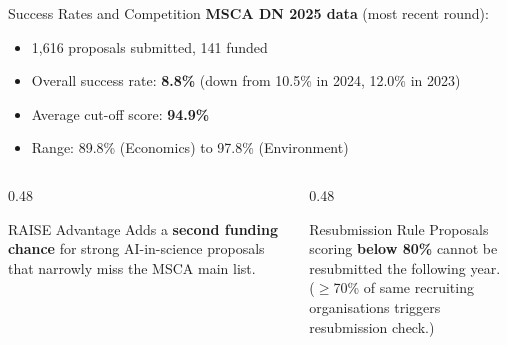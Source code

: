 \documentclass[aspectratio=169]{beamer}
\newcommand{\highlight}[1]{\textcolor{euBlue}{\textbf{#1}}}
\begin{document}
\begin{frame}{Success Rates and Competition}
\textbf{MSCA DN 2025 data} (most recent round):
\begin{itemize}
  \item 1,616 proposals submitted, 141 funded
  \item Overall success rate: \highlight{8.8\%} (down from 10.5\% in 2024, 12.0\% in 2023)
  \item Average cut-off score: \highlight{94.9\%}
  \item Range: 89.8\% (Economics) to 97.8\% (Environment)
\end{itemize}
\vspace{6pt}
\begin{columns}[T]
\begin{column}{0.48\textwidth}
\begin{exampleblock}{RAISE Advantage}
Adds a \textbf{second funding chance} for strong AI-in-science proposals that narrowly miss the MSCA main list.
\end{exampleblock}
\end{column}
\begin{column}{0.48\textwidth}
\begin{alertblock}{Resubmission Rule}
Proposals scoring \textbf{below 80\%} cannot be resubmitted the following year.\\ {\small ($\geq$70\% of same recruiting organisations triggers resubmission check.)}
\end{alertblock}
\end{column}
\end{columns}
\end{frame}
\end{document}
